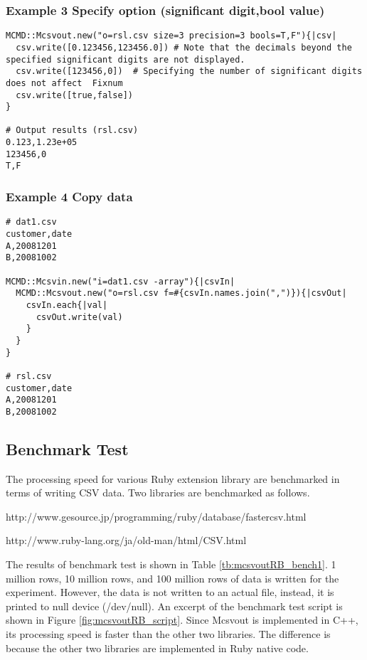 \subsubsection*{Example 3 Specify option (significant digit,bool value)}

\begin{Verbatim}[baselinestretch=0.7,frame=single]
MCMD::Mcsvout.new("o=rsl.csv size=3 precision=3 bools=T,F"){|csv|
  csv.write([0.123456,123456.0]) # Note that the decimals beyond the specified significant digits are not displayed. 
  csv.write([123456,0])  # Specifying the number of significant digits does not affect  Fixnum
  csv.write([true,false])
}

# Output results (rsl.csv)
0.123,1.23e+05
123456,0
T,F
\end{Verbatim}

\subsubsection*{Example 4 Copy data}

\begin{Verbatim}[baselinestretch=0.7,frame=single]
# dat1.csv
customer,date
A,20081201
B,20081002

MCMD::Mcsvin.new("i=dat1.csv -array"){|csvIn|
  MCMD::Mcsvout.new("o=rsl.csv f=#{csvIn.names.join(",")}){|csvOut|
    csvIn.each{|val|
      csvOut.write(val)
    }
  }
}

# rsl.csv
customer,date
A,20081201
B,20081002
\end{Verbatim}

\subsection{Benchmark Test}

The processing speed for various Ruby extension library are benchmarked in terms of writing CSV data. Two libraries are benchmarked as follows. 

\begin{description}
\setlength{\itemindent}{0mm}
\item[FasterCSV] http://www.gesource.jp/programming/ruby/database/fastercsv.html
\item[CSV] http://www.ruby-lang.org/ja/old-man/html/CSV.html
\end{description}

The results of benchmark test is shown in Table \ref{tb:mcsvoutRB_bench1}. 
1 million rows, 10 million rows, and 100 million rows of data is written for the experiment. However, the data is not written to an actual file, instead, it is printed to null device (/dev/null). An excerpt of the benchmark test script is shown in Figure \ref{fig:mcsvoutRB_script}. 
Since Mcsvout is implemented in C++, its processing speed is faster than the other two libraries. The difference is because the other two libraries are implemented in Ruby native code. 


